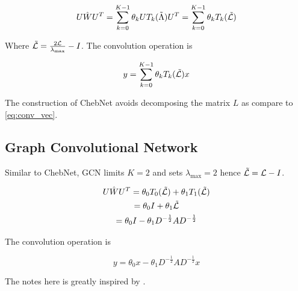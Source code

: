 \documentclass{article}
\begin{document}
    \begin{equation}
        U \hat{W} U^T = \sum_{k=0}^{K-1} \theta_k U T_k(\Tilde{\Lambda}) U^T = \sum_{k=0}^{K-1} \theta_k T_k(\Tilde{\mathcal{L}})
    \end{equation}

    Where $\Tilde{\mathcal{L}} = \frac{2 \mathcal{L}}{\lambda_{\max}} - I$. The convolution operation is

    \begin{equation}
        y = \sum_{k=0}^{K-1} \theta_k T_k(\Tilde{\mathcal{L}}) x
    \end{equation}



    The construction of ChebNet avoids decomposing the matrix $L$ as compare to \ref{eq:conv_vec}.

    \subsection{Graph Convolutional Network}

    Similar to ChebNet, GCN \cite{kipf2016semi} limits $K = 2$ and sets $\lambda_{\max} = 2$ hence $\Tilde{\mathcal{L}} = \mathcal{L} - I$.

    \begin{gather*}
        U \hat{W} U^T = \theta_0 T_0(\Tilde{\mathcal{L}}) + \theta_1 T_1(\Tilde{\mathcal{L}}) \\
        = \theta_0 I + \theta_1 \Tilde{\mathcal{L}} \\
        = \theta_0 I - \theta_1 D^{-\frac{1}{2}} A D^{-\frac{1}{2}}
    \end{gather*}

    The convolution operation is

    \begin{equation}
        y = \theta_0 x - \theta_1 D^{-\frac{1}{2}} A D^{-\frac{1}{2}} x
    \end{equation}

    The notes here is greatly inspired by \cite{chen2020note}.

    
    
\end{document}

